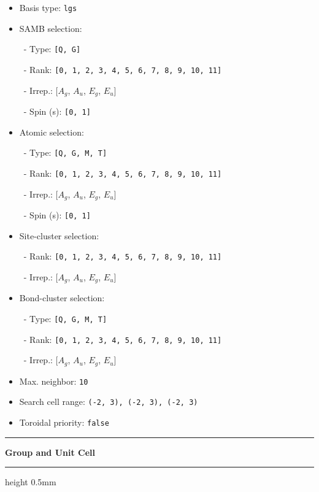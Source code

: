 \documentclass[fleqn,10pt,landscape]{jsarticle}
\begin{document}
\begin{itemize}
\item Basis type: \texttt{lgs}

\item SAMB selection:

\, - Type: \texttt{[Q, G]}

\, - Rank: \texttt{[0, 1, 2, 3, 4, 5, 6, 7, 8, 9, 10, 11]}

\, - Irrep.: [$A_{g}$, $A_{u}$, $E_{g}$, $E_{u}$]

\, - Spin (s): \texttt{[0, 1]}

\item Atomic selection:

\, - Type: \texttt{[Q, G, M, T]}

\, - Rank: \texttt{[0, 1, 2, 3, 4, 5, 6, 7, 8, 9, 10, 11]}

\, - Irrep.: [$A_{g}$, $A_{u}$, $E_{g}$, $E_{u}$]

\, - Spin (s): \texttt{[0, 1]}

\item Site-cluster selection:

\, - Rank: \texttt{[0, 1, 2, 3, 4, 5, 6, 7, 8, 9, 10, 11]}

\, - Irrep.: [$A_{g}$, $A_{u}$, $E_{g}$, $E_{u}$]

\item Bond-cluster selection:

\, - Type: \texttt{[Q, G, M, T]}

\, - Rank: \texttt{[0, 1, 2, 3, 4, 5, 6, 7, 8, 9, 10, 11]}

\, - Irrep.: [$A_{g}$, $A_{u}$, $E_{g}$, $E_{u}$]

\item Max. neighbor: \texttt{10}

\item Search cell range: \texttt{(-2, 3), (-2, 3), (-2, 3)}

\item Toroidal priority: \texttt{false}

\end{itemize}
\vspace{5mm}
\noindent \rule[0.5mm]{5mm}{0.5mm}\hspace{3mm}\textbf{Group and Unit Cell}\hspace{3mm}\leaders\hrule height 0.5mm\hfill\kern0pt
\vspace{3mm}
\end{document}
